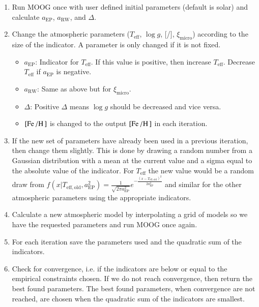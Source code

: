 \documentclass{aa}
\begin{document}
\begin{enumerate}
    \item Run MOOG once with user defined initial parameters (default is
          solar) and calculate $a_\mathrm{EP}$, $a_\mathrm{RW}$, and
          $\Delta$.
    \item Change the atmospheric parameters ($T_\mathrm{eff}$, $\log g$,
          [/], $\xi_\mathrm{micro}$) according to the size of the
          indicator. A parameter is only changed if it is not fixed.
    \begin{itemize}
        \item $a_\mathrm{EP}$: Indicator for $T_\mathrm{eff}$. If this value
              is positive, then increase $T_\mathrm{eff}$. Decrease
              $T_\mathrm{eff}$ if $a_\mathrm{EP}$ is negative.
        \item $a_\mathrm{RW}$: Same as above but for $\xi_\mathrm{micro}$.
        \item $\Delta$: Positive $\Delta$ means $\log g$
              should be decreased and vice versa.
        \item $[\ion{Fe}{}/\ion{H}{}]$ is changed to the output
              $[\ion{Fe}{}/\ion{H}{}]$ in each iteration.
    \end{itemize}
    \item If the new set of parameters have already been used in a previous
          iteration, then change them slightly. This is done by drawing a random
          number from a Gaussian distribution with a mean at the current value
          and a sigma equal to the absolute value of the indicator. For $T_\mathrm{eff}$
          the new value would be a random draw from
          $f(x|T_\mathrm{eff,old},a_\mathrm{EP}^2) = \frac{1}{\sqrt{2\pi a_\mathrm{EP}^2 }}e^{-\frac{(x - T_\mathrm{eff,old})^2 } {2 a_\mathrm{EP}^2} }$
          and similar for the other atmospheric parameters using the appropriate
          indicators.
    \item Calculate a new atmospheric model by interpolating a grid of models
          so we have the requested parameters and run MOOG once again.
    \item For each iteration save the parameters used and the quadratic sum of
          the indicators.
    \item Check for convergence, i.e. if the indicators are below or equal
          to the empirical constraints chosen. If we do not reach convergence,
          then return the best found parameters. The best found parameters,
          when convergence are not reached, are chosen when the quadratic sum
          of the indicators are smallest.
\end{enumerate}
\end{document}
